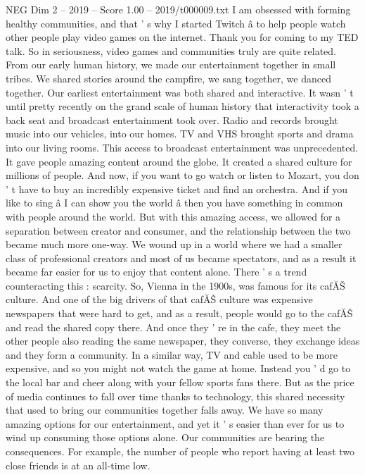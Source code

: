 \begin{textsample}{NEG Dim 2 – 2019 – Score 1.00 – 2019/t000009.txt}  \label{ex:f2_neg_060}
I am obsessed with forming healthy communities, and that ' s why I started Twitch â to help people watch other people play video games on the internet.
Thank you for coming to my TED talk.
So in seriousness, video games and communities truly are quite related.
From our early human history, we made our entertainment together in small tribes.
We shared stories around the campfire, we sang together, we danced together.
Our earliest entertainment was both shared and interactive.
It wasn ' t until pretty recently on the grand scale of human history that interactivity took a back seat and broadcast entertainment took over.
Radio and records brought music into our vehicles, into our homes.
TV and VHS brought sports and drama into our living rooms.
This access to broadcast entertainment was unprecedented.
It gave people amazing content around the globe.
It created a shared culture for millions of people.
And now, if you want to go watch or listen to Mozart, you don ' t have to buy an incredibly expensive ticket and find an orchestra.
And if you like to sing â I can show you the world â then you have something in common with people around the world.
But with this amazing access, we allowed for a separation between creator and consumer, and the relationship between the two became much more one-way.
We wound up in a world where we had a smaller class of professional creators and most of us became spectators, and as a result it became far easier for us to enjoy that content alone.
There ' s a trend counteracting this : scarcity.
So, Vienna in the 1900s, was famous for its cafĂŠ culture.
And one of the big drivers of that cafĂŠ culture was expensive newspapers that were hard to get, and as a result, people would go to the cafĂŠ and read the shared copy there.
And once they ' re in the cafe, they meet the other people also reading the same newspaper, they converse, they exchange ideas and they form a community.
In a similar way, TV and cable used to be more expensive, and so you might not watch the game at home.
Instead you ' d go to the local bar and cheer along with your fellow sports fans there.
But as the price of media continues to fall over time thanks to technology, this shared necessity that used to bring our communities together falls away.
We have so many amazing options for our entertainment, and yet it ' s easier than ever for us to wind up consuming those options alone.
Our communities are bearing the consequences.
For example, the number of people who report having at least two close friends is at an all-time low.

\end{textsample}
